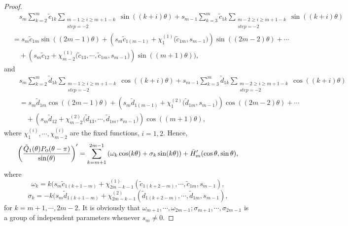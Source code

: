 \documentclass[11pt]{amsart}
\theoremstyle{remark}
\theoremstyle{definition}
\begin{document}
\begin{proof}
\begin{equation*}\label{poequa-15}
\begin{split}&\quad s_{m}\sum_{k=2}^{m}\tilde{c}_{1k}\sum_{\substack{m-1\geq i\geq m+1-k\\ step=-2}}\sin ((k+i)\theta)+s_{m-1}\sum_{k=3}^{m}\tilde{c}_{1k}\sum_{\substack{m-2\geq i\geq m+1-k\\ step=-2}}\sin ((k+i)\theta)\\
&= s_{m}\tilde{c}_{1m}\sin((2m-1)\theta)+\left( s_{m}\tilde{c}_{1(m-1)}+\chi^{(1)}_1{(\tilde{c}_{1m}}, s_{m-1})\right)\sin((2m-2)\theta)+\cdots\\
&\quad+\left( s_{m}\tilde{c}_{12}+\chi^{(1)}_{m-2}{(\tilde{c}_{13},\cdots,\tilde{c}_{1m}}, s_{m-1})\right)\sin((m+1)\theta)), \end{split}\end{equation*}
and
\begin{equation*}\label{poequa-15}
\begin{split}\quad & s_{m}\sum_{k=2}^m\tilde{d}_{1k}\sum_{\substack{m-1\geq i\geq m+1-k\\ step=-2}}\cos ((k+i)\theta)+s_{m-1}\sum_{k=3}^m\tilde{d}_{1k}\sum_{\substack{m-2\geq i\geq m+1-k\\ step=-2}}\cos ((k+i)\theta)\\
&= s_{m}\tilde{d}_{1m}\cos((2m-1)\theta)+\left( s_{m}\tilde{d}_{1(m-1)}+\chi^{(2)}_1{(\tilde{d}_{1m}}, s_{m-1})\right)\cos((2m-2)\theta)+\cdots\\
&\quad+\left( s_{m}\tilde{d}_{12}+\chi^{(2)}_{m-2}{(\tilde{d}_{13},\cdots,\tilde{d}_{1m}}, s_{m-1})\right)\cos((m+1)\theta), \end{split}\end{equation*}
where $\chi^{(i)}_1, \cdots, \chi^{(i)}_{m-2}$ are the fixed  functions,   $i=1, 2$.  Hence,
\begin{equation} \label{poequa-16}
\left(\frac{\tilde{Q}_1(\theta)P_{\mbox{\small{o}}}(\theta-\pi)}{\sin (\theta)}\right)'=\sum_{k=m+1}^{2m-1}\left(\omega_k\cos(k\theta)+\sigma_k\sin(k\theta)\right)+\bar{H}'_m(\cos\theta,\sin\theta),  \end{equation}
where  $$\omega_k=k(s_{m}\tilde{c}_{1(k+1-m)}+\chi^{(1)}_{2m-k-1}(\tilde{c}_{1(k+2-m)},\cdots,\tilde{c}_{1m}, s_{m-1}), $$
$$ \sigma_k=-k( s_{m}\tilde{d}_{1(k+1-m)}+\chi^{(2)}_{2m-k-1}(\tilde{d}_{1(k+2-m)},\cdots,\tilde{d}_{1m}, s_{m-1}),$$
for  $ k=m+1,\cdots, 2m-2$. It is obviously that  $\omega_{m+1},\cdots, \omega_{2m-1};\sigma_{m+1},\cdots, \sigma_{2m-1}$ is a group of independent parameters whenever $s_m\neq 0$.


\end{proof}
\end{document}
